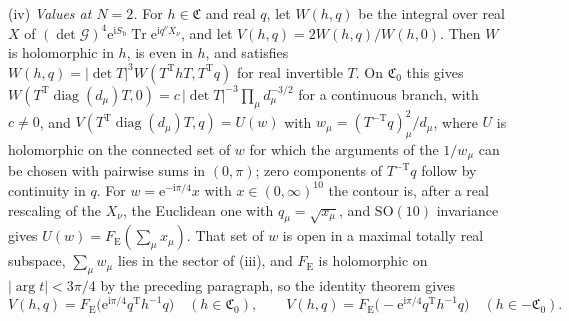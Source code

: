 (iv) \emph{Values at \(N=2\).} For \(h\in\mathfrak C\) and real \(q\), let \(W(h,q)\) be the integral over real \(X\) of \((\det\mathcal G)^4\mathrm e^{\mathrm iS_{\mathrm b}}\operatorname{Tr}\mathrm e^{\mathrm iq^\nu X_\nu}\), and let \(V(h,q)=2W(h,q)/W(h,0)\). Then \(W\) is holomorphic in \(h\), is even in \(h\), and satisfies \(W(h,q)=|\det T|^3W(T^{\mathrm T}hT,T^{\mathrm T}q)\) for real invertible \(T\). On \(\mathfrak C_0\) this gives \(W(T^{\mathrm T}\operatorname{diag}(d_\mu)T,0)=c\,|\det T|^{-3}\prod_\mu d_\mu^{-3/2}\) for a continuous branch, with \(c\neq0\), and \(V(T^{\mathrm T}\operatorname{diag}(d_\mu)T,q)=U(w)\) with \(w_\mu=(T^{-\mathrm T}q)_\mu^2/d_\mu\), where \(U\) is holomorphic on the connected set of \(w\) for which the arguments of the \(1/w_\mu\) can be chosen with pairwise sums in \((0,\pi)\); zero components of \(T^{-\mathrm T}q\) follow by continuity in \(q\). For \(w=\mathrm e^{-\mathrm i\pi/4}x\) with \(x\in(0,\infty)^{10}\) the contour is, after a real rescaling of the \(X_\nu\), the Euclidean one with \(q_\mu=\sqrt{x_\mu}\), and \(\mathrm{SO}(10)\) invariance gives \(U(w)=F_{\mathrm E}(\sum_\mu x_\mu)\). That set of \(w\) is open in a maximal totally real subspace, \(\sum_\mu w_\mu\) lies in the sector of (iii), and \(F_{\mathrm E}\) is holomorphic on \(|\arg t|<3\pi/4\) by the preceding paragraph, so the identity theorem gives
\[
V(h,q)=F_{\mathrm E}\bigl(\mathrm e^{\mathrm i\pi/4}q^{\mathrm T}h^{-1}q\bigr)\quad(h\in\mathfrak C_0),\qquad V(h,q)=F_{\mathrm E}\bigl(-\mathrm e^{\mathrm i\pi/4}q^{\mathrm T}h^{-1}q\bigr)\quad(h\in-\mathfrak C_0).
\]


